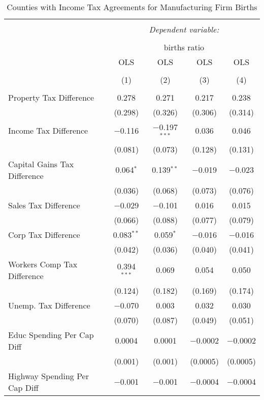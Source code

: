 
\begin{table}[!htbp] \centering 
  \caption{Counties with Income Tax Agreements for  Manufacturing Firm Births} 
  \label{31-33rd} 
\begin{tabular}{@{\extracolsep{5pt}}lcccc} 
\\[-1.8ex]\hline 
\hline \\[-1.8ex] 
 & \multicolumn{4}{c}{\textit{Dependent variable:}} \\ 
\cline{2-5} 
\\[-1.8ex] & \multicolumn{4}{c}{births ratio} \\ 
 & OLS & OLS & OLS & OLS \\ 
\\[-1.8ex] & (1) & (2) & (3) & (4)\\ 
\hline \\[-1.8ex] 
 Property Tax Difference & 0.278 & 0.271 & 0.217 & 0.238 \\ 
  & (0.298) & (0.326) & (0.306) & (0.314) \\ 
  Income Tax Difference & $-$0.116 & $-$0.197$^{***}$ & 0.036 & 0.046 \\ 
  & (0.081) & (0.073) & (0.128) & (0.131) \\ 
  Capital Gains Tax Difference & 0.064$^{*}$ & 0.139$^{**}$ & $-$0.019 & $-$0.023 \\ 
  & (0.036) & (0.068) & (0.073) & (0.076) \\ 
  Sales Tax Difference & $-$0.029 & $-$0.101 & 0.016 & 0.015 \\ 
  & (0.066) & (0.088) & (0.077) & (0.079) \\ 
  Corp Tax Difference & 0.083$^{**}$ & 0.059$^{*}$ & $-$0.016 & $-$0.016 \\ 
  & (0.042) & (0.036) & (0.040) & (0.041) \\ 
  Workers Comp Tax Difference & 0.394$^{***}$ & 0.069 & 0.054 & 0.050 \\ 
  & (0.124) & (0.182) & (0.169) & (0.174) \\ 
  Unemp. Tax Difference & $-$0.070 & 0.003 & 0.032 & 0.030 \\ 
  & (0.070) & (0.087) & (0.049) & (0.051) \\ 
  Educ Spending Per Cap Diff & 0.0004 & 0.0001 & $-$0.0002 & $-$0.0002 \\ 
  & (0.001) & (0.001) & (0.0005) & (0.0005) \\ 
  Highway Spending Per Cap Diff & $-$0.001 & $-$0.001 & $-$0.0004 & $-$0.0004 \\ 

\end{tabular}
\end{table}
